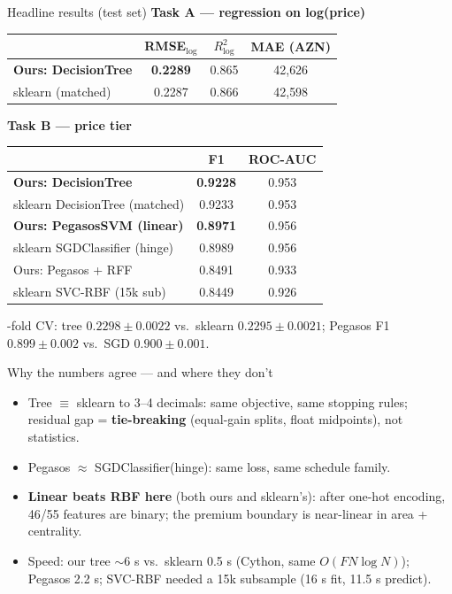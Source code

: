 \documentclass[aspectratio=169,10pt]{beamer}
\begin{document}
\begin{frame}{Headline results (test set)}
  \small
  \textbf{Task A — regression on log(price)}\par\smallskip
  \begin{tabular}{@{}lccc@{}}
    \toprule
    & RMSE$_{\log}$ & $R^2_{\log}$ & MAE (AZN) \\
    \midrule
    \textbf{Ours: DecisionTree} & \textbf{0.2289} & 0.865 & 42{,}626 \\
    sklearn (matched) & 0.2287 & 0.866 & 42{,}598 \\
    \bottomrule
  \end{tabular}
  \par\bigskip
  \textbf{Task B — price tier}\par\smallskip
  \begin{tabular}{@{}lcc@{}}
    \toprule
    & F1 & ROC-AUC \\
    \midrule
    \textbf{Ours: DecisionTree} & \textbf{0.9228} & 0.953 \\
    sklearn DecisionTree (matched) & 0.9233 & 0.953 \\
    \textbf{Ours: PegasosSVM (linear)} & \textbf{0.8971} & 0.956 \\
    sklearn SGDClassifier (hinge) & 0.8989 & 0.956 \\
    Ours: Pegasos + RFF & 0.8491 & 0.933 \\
    sklearn SVC-RBF (15k sub) & 0.8449 & 0.926 \\
    \bottomrule
  \end{tabular}
  \par{}-fold CV: tree $0.2298\pm0.0022$ vs.\ sklearn $0.2295\pm0.0021$;
  Pegasos F1 $0.899\pm0.002$ vs.\ SGD $0.900\pm0.001$.
\end{frame}

\begin{frame}{Why the numbers agree --- and where they don't}
  \begin{itemize}
    \item Tree $\equiv$ sklearn to 3--4 decimals: same objective, same
          stopping rules; residual gap = \textbf{tie-breaking} (equal-gain
          splits, float midpoints), not statistics.
    \item Pegasos $\approx$ SGDClassifier(hinge): same loss, same
          schedule family.
    \item \textbf{Linear beats RBF here} (both ours and sklearn's):
          after one-hot encoding, 46/55 features are binary; the
          premium boundary is near-linear in area + centrality.
    \item Speed: our tree $\sim$6 s vs.\ sklearn 0.5 s (Cython, same
          $O(FN\log N)$); Pegasos 2.2 s; SVC-RBF needed a 15k subsample
          (16 s fit, 11.5 s predict).
  \end{itemize}
\end{frame}
\end{document}
